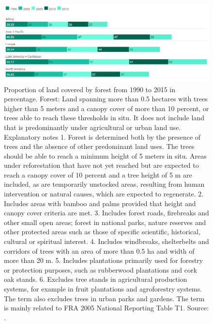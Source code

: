 \begin{figure}[H]
\centering
\includegraphics[width=1\linewidth]{Introduction/landcoveredbyforest.png}
\caption[Proportion of land covered by forest from 1990 to 2015 in percentage]{Proportion of land covered by forest from 1990 to 2015 in percentage. Forest: Land spanning more than 0.5 hectares with trees higher than 5 meters and a canopy cover of more than 10 percent, or trees able to reach these thresholds in situ. It does not include land that is predominantly under agricultural or urban land use. Explanatory notes 1. Forest is determined both by the presence of trees and the absence of other predominant land uses. The trees should be able to reach a minimum height of 5 meters in situ. Areas under reforestation that have not yet reached but are expected to reach a canopy cover of 10 percent and a tree height of 5 m are included, as are temporarily unstocked areas, resulting from human intervention or natural causes, which are expected to regenerate. 2. Includes areas with bamboo and palms provided that height and canopy cover criteria are met. 3. Includes forest roads, firebreaks and other small open areas; forest in national parks, nature reserves and other protected areas such as those of specific scientific, historical, cultural or spiritual interest. 4. Includes windbreaks, shelterbelts and corridors of trees with an area of more than 0.5 ha and width of more than 20 m. 5. Includes plantations primarily used for forestry or protection purposes, such as rubberwood plantations and cork oak stands. 6. Excludes tree stands in agricultural production systems, for example in fruit plantations and agroforestry systems. The term also excludes trees in urban parks and gardens. The term is mainly related to FRA 2005 National Reporting Table T1. Source: \citep{unep_2018}.}
\label{intro-fig:2}
\end{figure}

